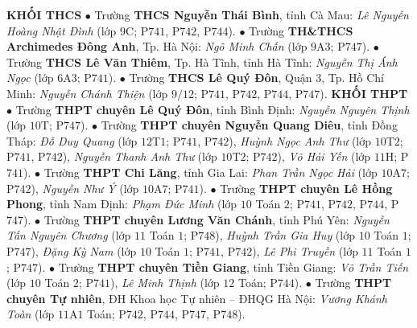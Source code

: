 \begin{multicols}{2}
	\textbf{\color{thachthuctoanhoc}KHỐI THCS}
	\vskip 0.05cm
	$\bullet$ Trường \textbf{\color{thachthuctoanhoc}THCS Nguyễn Thái Bình}, tỉnh Cà Mau: \textit{Lê Nguyễn Hoàng Nhật Đình} (lớp $9$C; P$741$, P$742$, P$744$).
	\vskip 0.05cm
	$\bullet$ Trường \textbf{\color{thachthuctoanhoc}TH\&THCS Archimedes Đông Anh}, Tp. Hà Nội: \textit{Ngô Minh Chấn} (lớp $9$A$3$; P$747$).
	\vskip 0.05cm
	$\bullet$ Trường \textbf{\color{thachthuctoanhoc}THCS Lê Văn Thiêm}, Tp. Hà Tĩnh, tỉnh Hà Tĩnh: \textit{Nguyễn Thị Ánh Ngọc} (lớp $6$A$3$; P$741$).
	\vskip 0.05cm
	$\bullet$ Trường \textbf{\color{thachthuctoanhoc}THCS Lê Quý Đôn}, Quận $3$, Tp. Hồ Chí Minh: \textit{Nguyễn Chánh Thiện} (lớp $9/12$; P$741$, P$742$, P$744$, P$747$).
	\vskip 0.05cm
	\textbf{\color{thachthuctoanhoc}KHỐI THPT}
	\vskip 0.05cm
	$\bullet$ Trường \textbf{\color{thachthuctoanhoc}THPT chuyên Lê Quý Đôn}, tỉnh Bình Định: \textit{Nguyễn Nguyên Thịnh} (lớp $10$T; P$747$).
	\vskip 0.05cm
	$\bullet$ Trường \textbf{\color{thachthuctoanhoc}THPT chuyên Nguyễn Quang Diêu}, tỉnh Đồng Tháp: \textit{Đỗ Duy Quang} (lớp $12$T$1$; P$741$, P$742$), \textit{Huỳnh Ngọc Anh Thư} (lớp $10$T$2$; P$741$, P$742$), \textit{Nguyễn Thanh Anh Thư} (lớp $10$T$2$; P$742$), \textit{Võ Hải Yến} (lớp $11$H; P$741$).
	\vskip 0.05cm
	$\bullet$ Trường \textbf{\color{thachthuctoanhoc}THPT Chi Lăng}, tỉnh Gia Lai: \textit{Phan Trần Ngọc Hải} (lớp $10$A$7$; P$742$), \textit{Nguyễn Như Ý} (lớp $10$A$7$; P$741$).
	\vskip 0.05cm
	$\bullet$ Trường \textbf{\color{thachthuctoanhoc}THPT chuyên Lê Hồng Phong}, tỉnh Nam Định: \textit{Phạm Đức Minh} (lớp $10$ Toán $2$; P$741$, P$742$, P$744$, P$747$).
	\vskip 0.05cm
	$\bullet$ Trường \textbf{\color{thachthuctoanhoc}THPT chuyên Lương Văn Chánh}, tỉnh Phú Yên: \textit{Nguyễn Tấn Nguyên Chương} (lớp $11$ Toán $1$; P$748$), \textit{Huỳnh Trần Gia Huy} (lớp $10$ Toán $1$; P$747$), \textit{Đặng Kỳ Nam} (lớp $10$ Toán $1$; P$741$, P$742$), \textit{Lê Phi Truyền} (lớp $11$ Toán $1$; P$747$).
	\vskip 0.05cm
	$\bullet$ Trường \textbf{\color{thachthuctoanhoc}THPT chuyên Tiền Giang}, tỉnh Tiền Giang: \textit{Võ Trần Tiến} (lớp $10$ Toán $2$; P$741$), \textit{Lê Minh Thịnh} (lớp $12$ Toán; P$744$).
	\vskip 0.05cm
	$\bullet$ Trường \textbf{\color{thachthuctoanhoc}THPT chuyên Tự nhiên}, ĐH Khoa học Tự nhiên -- ĐHQG Hà Nội: \textit{Vương Khánh Toàn} (lớp $11$A$1$ Toán; P$742$, P$744$, P$747$, P$748$).
\end{multicols}
